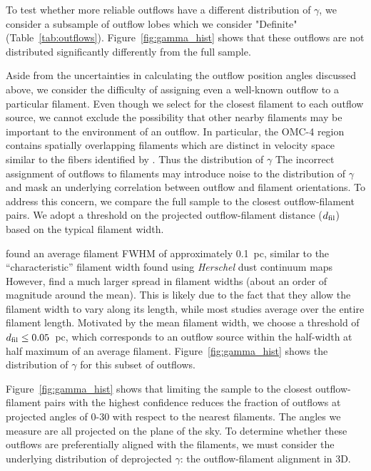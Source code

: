 \documentclass[twocolumn]{aastex63}
\begin{document}
To test whether more reliable outflows have a different distribution of $\gamma$, we consider a subsample of outflow lobes which we consider "Definite" (Table~\ref{tab:outflows}). Figure~\ref{fig:gamma_hist} shows that these outflows are not distributed significantly differently from the full sample.


Aside from the uncertainties in calculating the outflow position angles discussed above, we consider the difficulty of assigning even a well-known outflow to a particular filament. Even though we select for the closest filament to each outflow source, we cannot exclude the possibility that other nearby filaments may be important to the environment of an outflow. In particular, the OMC-4 region contains spatially overlapping filaments which are distinct in velocity space \citep{Suri19} similar to the fibers identified by \citet{Hacar13}. Thus the distribution of $\gamma$ The incorrect assignment of outflows to filaments may introduce noise to the distribution of $\gamma$ and mask an underlying correlation between outflow and filament orientations. To address this concern, we compare the full sample to the closest outflow-filament pairs. We adopt a threshold on the projected outflow-filament distance ($d_{\rm fil}$) based on the typical filament width.

\citet{Suri19} found an average filament FWHM of approximately 0.1~pc, similar to the ``characteristic'' filament width found using \emph{Herschel} dust continuum maps \citep[e.g.][]{Arzoumanian11,Koch15} However, \citet{Suri19} find a much larger spread in filament widths (about an order of magnitude around the mean). This is likely due to the fact that they allow the filament width to vary along its length, while most studies average over the entire filament length. Motivated by the mean filament width, we choose a threshold of $d_{\rm fil} \leq 0.05$~pc, which corresponds to an outflow source within the half-width at half maximum of an average filament. Figure~\ref{fig:gamma_hist} shows the distribution of $\gamma$ for this subset of outflows.

Figure~\ref{fig:gamma_hist} shows that limiting the sample to the closest outflow-filament pairs with the highest confidence reduces the fraction of outflows at projected angles of 0-30\degr{} with respect to the nearest filaments. The angles we measure are all projected on the plane of the sky. To determine whether these outflows are preferentially aligned with the filaments, we must consider the underlying distribution of deprojected $\gamma$: the outflow-filament alignment in 3D.
\end{document}

